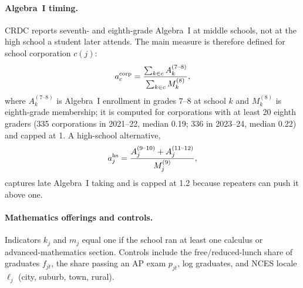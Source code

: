 \documentclass[aps,prd,reprint,superscriptaddress,nofootinbib,floatfix]{revtex4-2}
\begin{document}
\paragraph*{Algebra~I timing.} CRDC reports seventh- and eighth-grade Algebra~I at middle schools, not at the high school a student later attends. The main measure is therefore defined for school corporation $c(j)$:
\begin{equation}
a^{\rm corp}_{c}=\frac{\sum_{k\in c}A^{(7\text{--}8)}_{k}}{\sum_{k\in c}M^{(8)}_{k}},\label{eq:algcorp}
\end{equation}
where $A^{(7\text{--}8)}_k$ is Algebra~I enrollment in grades 7--8 at school $k$ and $M^{(8)}_k$ is eighth-grade membership; it is computed for corporations with at least 20 eighth graders (335 corporations in 2021--22, median 0.19; 336 in 2023--24, median 0.22) and capped at 1. A high-school alternative,
\begin{equation}
a^{\rm hs}_{j}=\frac{A^{(9\text{--}10)}_{j}+A^{(11\text{--}12)}_{j}}{M^{(9)}_{j}},\label{eq:alghs}
\end{equation}
captures late Algebra~I taking and is capped at 1.2 because repeaters can push it above one.

\paragraph*{Mathematics offerings and controls.} Indicators $k_j$ and $m_j$ equal one if the school ran at least one calculus or advanced-mathematics section. Controls include the free/reduced-lunch share of graduates $f_{jt}$, the share passing an AP exam $p_{jt}$, log graduates, and NCES locale $\ell_j$ (city, suburb, town, rural).
\end{document}
